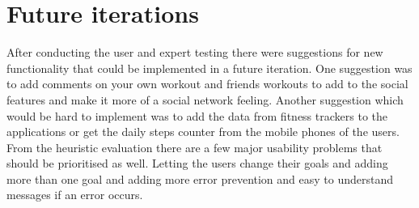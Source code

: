 \section{Future iterations}
After conducting the user and expert testing there were suggestions for new functionality that could be implemented in a future iteration. One suggestion was to add comments on your own workout and friends workouts to add to the social features and make it more of a social network feeling. Another suggestion which would be hard to implement was to add the data from fitness trackers to the applications or get the daily steps counter from the mobile phones of the users.  From the heuristic evaluation there are a few major usability problems that should be prioritised as well. Letting the users change their goals and adding more than one goal and adding more error prevention and easy to understand messages if an error occurs. 




